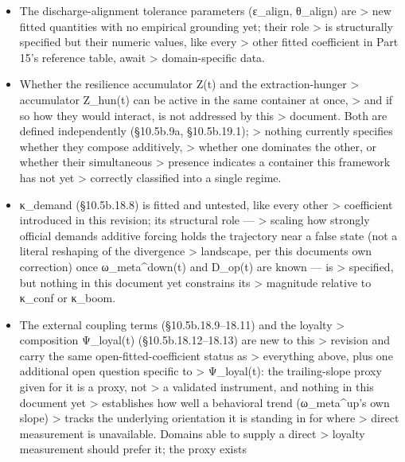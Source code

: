 \documentclass[
]{article}
\begin{document}
\begin{itemize}
  structural baseline tracking gives a partial comparison basis, but
  \textgreater{} a closed-form dynamic for either channel remains open.
\item
  The discharge-alignment tolerance parameters (ε\_align, θ\_align) are
  \textgreater{} new fitted quantities with no empirical grounding yet;
  their role \textgreater{} is structurally specified but their numeric
  values, like every \textgreater{} other fitted coefficient in Part
  15's reference table, await \textgreater{} domain-specific data.
\item
  Whether the resilience accumulator Z(t) and the extraction-hunger
  \textgreater{} accumulator Z\_hun(t) can be active in the same
  container at once, \textgreater{} and if so how they would interact,
  is not addressed by this \textgreater{} document. Both are defined
  independently (§10.5b.9a, §10.5b.19.1); \textgreater{} nothing
  currently specifies whether they compose additively, \textgreater{}
  whether one dominates the other, or whether their simultaneous
  \textgreater{} presence indicates a container this framework has not
  yet \textgreater{} correctly classified into a single regime.
\item
  κ\_demand (§10.5b.18.8) is fitted and untested, like every other
  \textgreater{} coefficient introduced in this revision; its structural
  role --- \textgreater{} scaling how strongly official
  demand\textquotesingle s additive forcing holds the trajectory near a
  false state (not a literal reshaping of the divergence \textgreater{}
  landscape, per this document\textquotesingle s own correction) once
  ω\_meta\^{}down(t) and D\_op(t) are known --- is \textgreater{}
  specified, but nothing in this document yet constrains its
  \textgreater{} magnitude relative to κ\_conf or κ\_boom.
\item
  The external coupling terms (§10.5b.18.9--18.11) and the loyalty
  \textgreater{} composition Ψ\_loyal(t) (§10.5b.18.12--18.13) are new
  to this \textgreater{} revision and carry the same
  open-fitted-coefficient status as \textgreater{} everything above,
  plus one additional open question specific to \textgreater{}
  Ψ\_loyal(t): the trailing-slope proxy given for it is a proxy, not
  \textgreater{} a validated instrument, and nothing in this document
  yet \textgreater{} establishes how well a behavioral trend
  (ω\_meta\^{}up's own slope) \textgreater{} tracks the underlying
  orientation it is standing in for where \textgreater{} direct
  measurement is unavailable. Domains able to supply a direct
  \textgreater{} loyalty measurement should prefer it; the proxy exists

\end{itemize}
\end{document}
